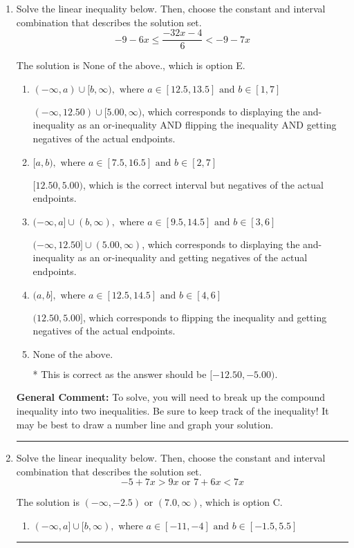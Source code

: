 \documentclass{extbook}[14pt]
\newcommand{\litem}[1]{\item #1

\rule{\textwidth}{0.4pt}}
\begin{document}
\begin{enumerate}\litem{
Solve the linear inequality below. Then, choose the constant and interval combination that describes the solution set.
\[ -9 - 6 x \leq \frac{-32 x - 4}{6} < -9 - 7 x \]

The solution is \( \text{None of the above.} \), which is option E.\begin{enumerate}[label=\Alph*.]
\item \( (-\infty, a) \cup [b, \infty), \text{ where } a \in [12.5, 13.5] \text{ and } b \in [1, 7] \)

$(-\infty, 12.50) \cup [5.00, \infty)$, which corresponds to displaying the and-inequality as an or-inequality AND flipping the inequality AND getting negatives of the actual endpoints.
\item \( [a, b), \text{ where } a \in [7.5, 16.5] \text{ and } b \in [2, 7] \)

$[12.50, 5.00)$, which is the correct interval but negatives of the actual endpoints.
\item \( (-\infty, a] \cup (b, \infty), \text{ where } a \in [9.5, 14.5] \text{ and } b \in [3, 6] \)

$(-\infty, 12.50] \cup (5.00, \infty)$, which corresponds to displaying the and-inequality as an or-inequality and getting negatives of the actual endpoints.
\item \( (a, b], \text{ where } a \in [12.5, 14.5] \text{ and } b \in [4, 6] \)

$(12.50, 5.00]$, which corresponds to flipping the inequality and getting negatives of the actual endpoints.
\item \( \text{None of the above.} \)

* This is correct as the answer should be $[-12.50, -5.00)$.
\end{enumerate}

\textbf{General Comment:} To solve, you will need to break up the compound inequality into two inequalities. Be sure to keep track of the inequality! It may be best to draw a number line and graph your solution.
}
\litem{
Solve the linear inequality below. Then, choose the constant and interval combination that describes the solution set.
\[ -5 + 7 x > 9 x \text{ or } 7 + 6 x < 7 x \]

The solution is \( (-\infty, -2.5) \text{ or } (7.0, \infty) \), which is option C.\begin{enumerate}[label=\Alph*.]
\item \( (-\infty, a] \cup [b, \infty), \text{ where } a \in [-11, -4] \text{ and } b \in [-1.5, 5.5] \)


\end{enumerate}}
\end{enumerate}
\end{document}
